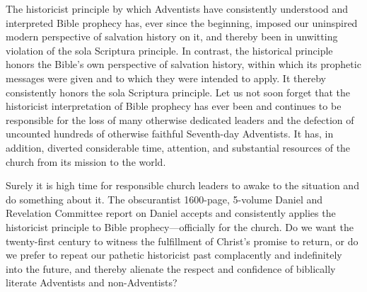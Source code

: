 The historicist principle by which Adventists have consistently understood
and interpreted Bible prophecy has, ever since the beginning, imposed our
uninspired modern perspective of salvation history on it, and thereby been
in unwitting violation of the sola Scriptura principle. In contrast, the
historical principle honors the Bible's own perspective of salvation
history, within which its prophetic messages were given and to which they
were intended to apply. It thereby consistently honors the sola Scriptura
principle. Let us not soon forget that the historicist interpretation of
Bible prophecy has ever been and continues to be responsible for the loss of
many otherwise dedicated leaders and the defection of uncounted hundreds of
otherwise faithful Seventh-day Adventists. It has, in addition, diverted
considerable time, attention, and substantial resources of the church from
its mission to the world.

Surely it is high time for responsible church leaders to awake to the
situation and do something about it. The obscurantist 1600-page, 5-volume
Daniel and Revelation Committee report on Daniel accepts and consistently
applies the historicist principle to Bible prophecy---officially for the
church. Do we want the twenty-first century to witness the fulfillment of
Christ's promise to return, or do we prefer to repeat our pathetic
historicist past complacently and indefinitely into the future, and thereby
alienate the respect and confidence of biblically literate Adventists and
non-Adventists?
